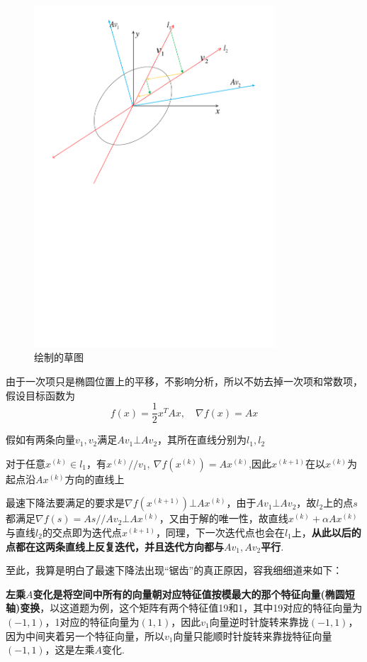 \begin{figure}[H]
\centering
\includegraphics[width=9cm]{fig/1_5.pdf}
\caption{绘制的草图}
\end{figure}

由于一次项只是椭圆位置上的平移，不影响分析，所以不妨去掉一次项和常数项，假设目标函数为
\[f(x)=\dfrac{1}{2}x^TAx,\quad \nabla f(x)=Ax\]

假如有两条向量$v_1,v_2$满足$Av_1\bot Av_2$，其所在直线分别为$l_1,l_2$

对于任意$x^{(k)}\in l_1$，有$x^{(k)}//v_1,\ \nabla f(x^{(k)})=Ax^{(k)}$,因此$x^{(k+1)}$在以$x^{(k)}$为起点沿$Ax^{(k)}$方向的直线上

最速下降法要满足的要求是$\nabla f(x^{(k+1)})\bot Ax^{(k)}$，由于$Av_1\bot Av_2$，故$l_2$上的点$s$都满足$\nabla f(s)=As//Av_2\bot Ax^{(k)}$，又由于解的唯一性，故直线$x^{(k)}+\alpha Ax^{(k)}$与直线$l_2$的交点即为迭代点$x^{(k+1)}$，同理，下一次迭代点也会在$l_1$上，\textbf{从此以后的点都在这两条直线上反复迭代，并且迭代方向都与$Av_1,Av_2$平行}.

至此，我算是明白了最速下降法出现“锯齿”的真正原因，容我细细道来如下：

\textbf{左乘$A$变化是将空间中所有的向量朝对应特征值按模最大的那个特征向量(椭圆短轴)变换}，以这道题为例，这个矩阵有两个特征值19和1，其中19对应的特征向量为$(-1,1)$，1对应的特征向量为$(1,1)$，因此$v_1$向量逆时针旋转来靠拢$(-1,1)$，因为中间夹着另一个特征向量，所以$v_1$向量只能顺时针旋转来靠拢特征向量$(-1,1)$，这是左乘$A$变化.

